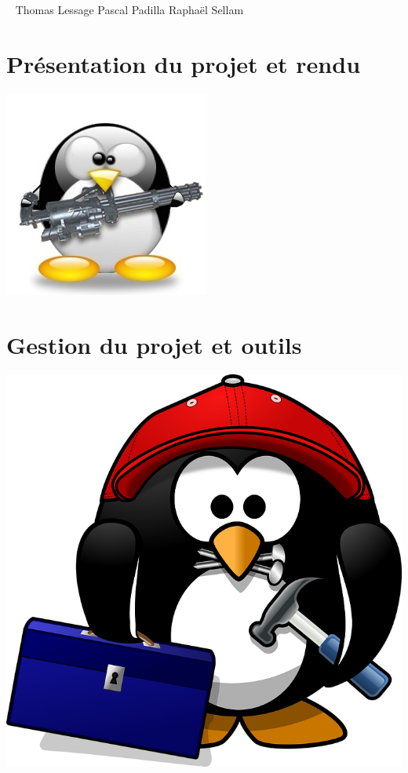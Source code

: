 \documentclass[10pt]{article}
\begin{document}
~ \hfill
Thomas Lessage
\hfill 
Pascal Padilla
\hfill
Raphaël Sellam
\hfill ~





\newpage
\newpage\pagecolor{greenamu!15}
\newpage


\newpage
\nopagecolor
\part{Présentation du projet et rendu}
\vspace*{\fill}
    \begin{center}
        \includegraphics[width=0.5\linewidth]{Presentation_Tux_soldier.jpg}
    \end{center}
\vspace*{\fill}

\newpage

\newpage
{}




\newpage
\part{Gestion du projet et outils}
\vspace*{\fill}
    \begin{center}
        \includegraphics[width=0.5\linewidth]{Outils_tux-161507_960_720.png}
    \end{center}
\vspace*{\fill}
\newpage
\end{document}
